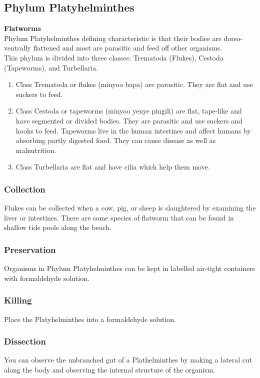 \subsection{Phylum Platyhelminthes}
\textbf{Flatworms}\\ 
Phylum Platyhelminthes defining characteristic is that their bodies are dorso-ventrally flattened and most are parasitic and feed off other organisms.\\
This phylum is divided into three classes: Trematoda (Flukes), Cestoda (Tapeworms), and Turbellaria.
\begin{enumerate}
\item{Class Trematoda or flukes (minyoo bapa) are parasitic. They are flat and use suckers to feed.}
\item{Class Cestoda or tapeworms (minyoo yenye pingili) are flat, tape-like and have segmented or divided bodies. They are parasitic and use suckers and hooks to feed. Tapeworms live in the human intestines and affect humans by absorbing partly digested food. They can cause disease as well as malnutrition.}
\item{Class Turbellaria are flat and have cilia which help them move.}
\end{enumerate}

\subsubsection{Collection}
 Flukes can be collected when a cow, pig, or sheep is slaughtered by examining the liver or intestines. There are some species of flatworm that can be found in shallow tide pools along the beach. 

\subsubsection{Preservation} 
Organisms in Phylum Platyhelminthes can be kept in labelled air-tight containers with formaldehyde solution.

\subsubsection{Killing}
Place the Platyhelminthes into a formaldehyde solution.

\subsubsection{Dissection}
You can observe the unbranched gut of a Plathelminthes by making a lateral cut along the body and observing the internal structure of the organism.

